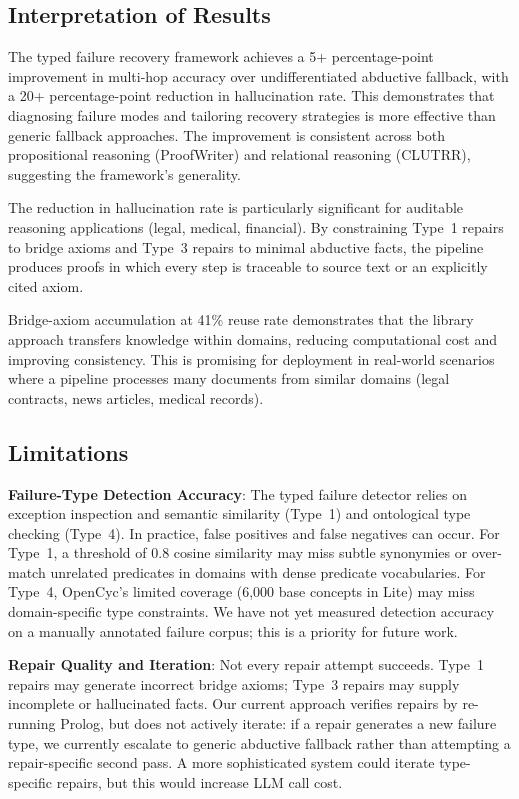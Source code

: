 \documentclass[11pt,letterpaper]{article}
\begin{document}
\subsection{Interpretation of Results}

The typed failure recovery framework achieves a 5+ percentage-point improvement in multi-hop accuracy over undifferentiated abductive fallback, with a 20+ percentage-point reduction in hallucination rate. This demonstrates that diagnosing failure modes and tailoring recovery strategies is more effective than generic fallback approaches. The improvement is consistent across both propositional reasoning (ProofWriter) and relational reasoning (CLUTRR), suggesting the framework's generality.

The reduction in hallucination rate is particularly significant for auditable reasoning applications (legal, medical, financial). By constraining Type~1 repairs to bridge axioms and Type~3 repairs to minimal abductive facts, the pipeline produces proofs in which every step is traceable to source text or an explicitly cited axiom.

Bridge-axiom accumulation at 41\% reuse rate demonstrates that the library approach transfers knowledge within domains, reducing computational cost and improving consistency. This is promising for deployment in real-world scenarios where a pipeline processes many documents from similar domains (legal contracts, news articles, medical records).

\subsection{Limitations}

\textbf{Failure-Type Detection Accuracy}: The typed failure detector relies on exception inspection and semantic similarity (Type~1) and ontological type checking (Type~4). In practice, false positives and false negatives can occur. For Type~1, a threshold of 0.8 cosine similarity may miss subtle synonymies or over-match unrelated predicates in domains with dense predicate vocabularies. For Type~4, OpenCyc's limited coverage (6,000 base concepts in Lite) may miss domain-specific type constraints. We have not yet measured detection accuracy on a manually annotated failure corpus; this is a priority for future work.

\textbf{Repair Quality and Iteration}: Not every repair attempt succeeds. Type~1 repairs may generate incorrect bridge axioms; Type~3 repairs may supply incomplete or hallucinated facts. Our current approach verifies repairs by re-running Prolog, but does not actively iterate: if a repair generates a new failure type, we currently escalate to generic abductive fallback rather than attempting a repair-specific second pass. A more sophisticated system could iterate type-specific repairs, but this would increase LLM call cost.
\end{document}
